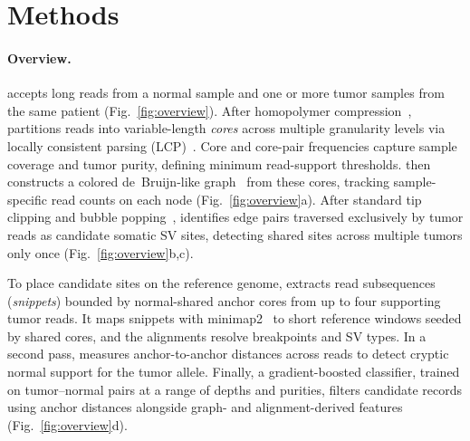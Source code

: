 \section{Methods}\label{sec:methods}

\paragraph{Overview.}
\tool accepts long reads from a normal sample and one or more tumor samples from the same patient (Fig.~\ref{fig:overview}). After homopolymer compression~\cite{Li_2018}, \tool partitions reads into variable-length \textit{cores} across multiple granularity levels via locally consistent parsing (LCP)~\cite{lcpan,sv94a}. Core and core-pair frequencies capture sample coverage and tumor purity, defining minimum read-support thresholds. \tool then constructs a colored de~Bruijn-like graph~\cite{cortex} from these cores, tracking sample-specific read counts on each node (Fig.~\ref{fig:overview}a). After standard tip clipping and bubble popping~\cite{velvet}, \tool identifies edge pairs traversed exclusively by tumor reads as candidate somatic SV sites, detecting shared sites across multiple tumors only once (Fig.~\ref{fig:overview}b,c).

To place candidate sites on the reference genome, \tool extracts read subsequences (\textit{snippets}) bounded by normal-shared anchor cores from up to four supporting tumor reads. It maps snippets with minimap2~\cite{Li_2018} to short reference windows seeded by shared cores, and the alignments resolve breakpoints and SV types. In a second pass, \tool measures anchor-to-anchor distances across reads to detect cryptic normal support for the tumor allele. Finally, a gradient-boosted classifier, trained on tumor--normal pairs at a range of depths and purities, filters candidate records using anchor distances alongside graph- and alignment-derived features (Fig.~\ref{fig:overview}d).


